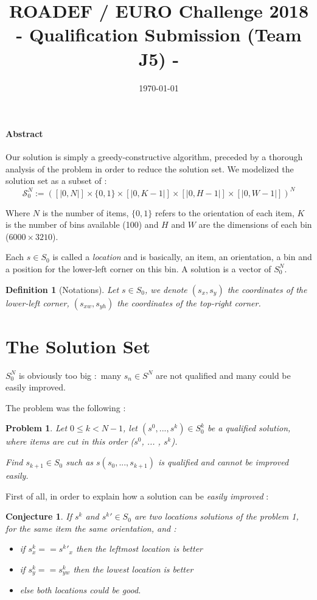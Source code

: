 \documentclass{article}
\title{ROADEF / EURO Challenge 2018 \\
    - Qualification Submission (Team J5) -}
\date{\today}
\author{}
\newtheorem{problem}{Problem}
\newtheorem{definition}{Definition}
\newtheorem{conjecture}{Conjecture}
\begin{document}
        \maketitle
\paragraph{Abstract}Our solution is simply a greedy-constructive algorithm, preceded by a thorough analysis of the problem in order to reduce the solution set. We modelized the solution set as a subset of :
\[ \mathcal{S}_0^N := ([|0, N|]\times\{0,1\}\times[|0, K - 1|]\times[|0, H - 1|]\times[|0, W - 1|])^N\]

Where $N$ is the number of items, $\{0, 1\}$ refers to the orientation of each item, $K$ is the number of bins available (100) and $H$ and $W$ are the dimensions of each bin ($6000\times 3210$). 


Each $s \in S_0$ is called a \textit{location} and is basically, an item, an orientation, a bin and a position for the lower-left corner on this bin. A solution is a vector of $S_0^N$. 
\begin{definition}[Notations]
    Let $s \in S_0$, we denote $(s_x, s_y)$ the coordinates of the lower-left corner, $(s_{xw}, s_{yh})$ the coordinates of the top-right corner.
\end{definition}

    \section{The Solution Set}
        
    $S_0^N$ is obviously too big : many $s_n \in S^N$ are not qualified and many could be easily improved.

    The problem was the following :
    
    \begin{problem}
    Let $0 \leq k  < N - 1$, let $(s^0, ..., s^k) \in S_0^k$ be a qualified solution, where items are cut in this order ($s^0$, ... , $s^k$). 
    
    Find $s_{k + 1} \in S_0$ such as $s(s_0, ..., s_{k + 1})$ is qualified and cannot be improved \textit{easily}.
    \end{problem}

    First of all, in order to explain how a solution can be \textit{easily improved} :

    \begin{conjecture}
        If $s^k$ and $s^k'\in S_0$ are two locations solutions of the problem 1, for the same item the same orientation, and :
        \begin{itemize}
            \item if $s^k_x == s^k'_x$ then the leftmost location is better
            \item if $s^k_{y} == s^k_{yw}$ then the lowest location is better
            \item else both locations could be good.
        \end{itemize}
    \end{conjecture}
\end{document}
